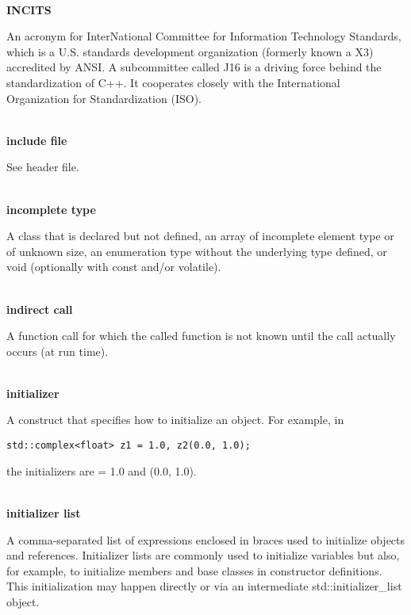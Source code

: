 \hspace*{\fill} \\ %
\noindent
\textbf{INCITS}

An acronym for InterNational Committee for Information Technology Standards, which is a U.S. standards development organization (formerly known a X3) accredited by ANSI. A subcommittee called J16 is a driving force behind the standardization of C++. It cooperates closely with the International Organization for Standardization (ISO).

\hspace*{\fill} \\ %
\noindent
\textbf{include file}

See header file.

\hspace*{\fill} \\ %
\noindent
\textbf{incomplete type}

A class that is declared but not defined, an array of incomplete element type or of unknown size, an enumeration type without the underlying type defined, or void (optionally with const and/or volatile).

\hspace*{\fill} \\ %
\noindent
\textbf{indirect call}

A function call for which the called function is not known until the call actually occurs (at run time).

\hspace*{\fill} \\ %
\noindent
\textbf{initializer}

A construct that specifies how to initialize an object. For example, in
\begin{lstlisting}[style=styleCXX]
std::complex<float> z1 = 1.0, z2(0.0, 1.0);
\end{lstlisting}
the initializers are = 1.0 and (0.0, 1.0).

\hspace*{\fill} \\ %
\noindent
\textbf{initializer list}

A comma-separated list of expressions enclosed in braces used to initialize objects and references. Initializer lists are commonly used to initialize variables but also, for example, to initialize members and base classes in constructor definitions. This initialization may happen directly or via an intermediate std::initializer\_list object.

